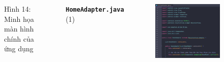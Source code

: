 \documentclass{beamer}
\begin{document}
\begin{frame}
\begin{columns}
\begin{figure}
            \caption{\centering\tiny{Hình 14: Minh họa màn hình chính của ứng dụng}}
        \end{figure}
        \indent \textbf{\texttt{HomeAdapter.java}} (1)
        \begin{figure}
            \centering
            \includegraphics[width=\textwidth]{images/18.png}
        \end{figure}
    \end{columns}
\end{frame}
\end{document}
